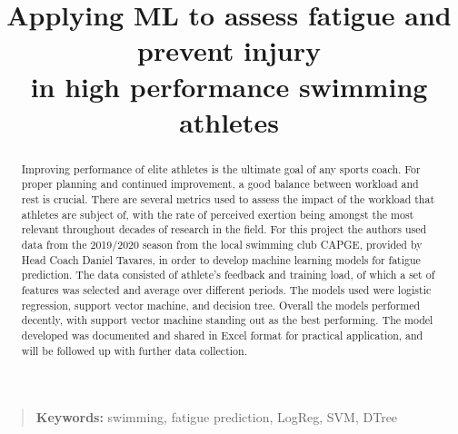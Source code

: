 \documentclass[conference]{IEEEtran}
\begin{document}
\title{Applying ML to assess fatigue and prevent injury\\in high performance swimming athletes}

\author{
\and
{}
}


\maketitle
\thispagestyle{plain}


\begin{abstract}
Improving performance of elite athletes is the ultimate goal of any sports coach. For proper planning and continued improvement, a good balance between workload and rest is crucial. There are several metrics used to assess the impact of the workload that athletes are subject of, with the rate of perceived exertion being amongst the most relevant throughout decades of research in the field. 
For this project the authors used data from the 2019/2020 season from the local swimming club CAPGE, provided by Head Coach Daniel Tavares, in order to develop machine learning models for fatigue prediction. The data consisted of athlete's feedback and training load, of which a set of features was selected and average over different periods. The models used were logistic regression, support vector machine, and decision tree. Overall the models performed decently, with support vector machine standing out as the best performing. 
The model developed was documented and shared in Excel format for practical application, and will be followed up with further data collection.
\end{abstract}

\begin{quote}
\small
\noindent
\textbf{Keywords:} swimming, fatigue prediction, LogReg, SVM, DTree
\end{quote}
\end{document}
